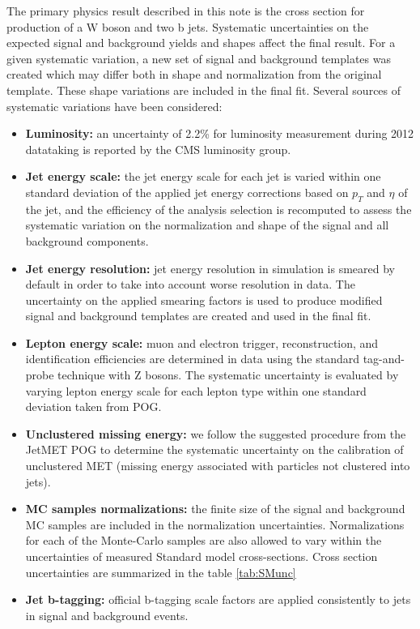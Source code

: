 The primary physics result described in this note is the cross section for production of a W boson and two b
jets. Systematic uncertainties on the expected signal and background yields and shapes affect
the final result. For a given systematic variation, a new set of signal and background templates was created which may differ both in shape and normalization from the original template.  These shape variations are included in the final fit. Several sources of systematic variations have been considered:

\begin{itemize}
        \item{\textbf{Luminosity:}}
        an uncertainty of 2.2\% for luminosity measurement during 2012 datataking is reported by the CMS luminosity group.
        \item{\textbf{Jet energy scale:}}
        the jet energy scale for each jet is varied within one standard deviation of the applied jet energy corrections based on $p_T$ and $\eta$ of the jet, and the efficiency of the analysis selection is recomputed to assess the systematic variation on the normalization and shape of the signal and all background components.
        \item{\textbf{Jet energy resolution:}}
        jet energy resolution in simulation is smeared by default in order to take into account worse resolution in data. The uncertainty on the applied smearing factors is used to produce modified signal and background templates are created and used in the final fit.
        \item{\textbf{Lepton energy scale:}}
        muon and electron trigger, reconstruction, and identification efficiencies are determined in data using the standard tag-and-probe technique with Z bosons. The systematic uncertainty is evaluated by varying lepton energy scale for each lepton type within one standard deviation taken from POG.
        \item{\textbf{Unclustered missing energy:}}
        we follow the suggested procedure from the JetMET POG to determine the systematic uncertainty on the calibration of unclustered MET (missing energy associated with particles not clustered into jets).
        \item{\textbf{MC samples normalizations:}}
        the finite size of the signal and background MC samples are included in the normalization uncertainties. Normalizations for each of the Monte-Carlo samples are also allowed to vary within the uncertainties of measured Standard model cross-sections. Cross section uncertainties are summarized in the table \ref{tab:SMunc}
        \item{\textbf{Jet b-tagging:}}
        official b-tagging scale factors are applied consistently to jets in signal and background events.
\end{itemize}

